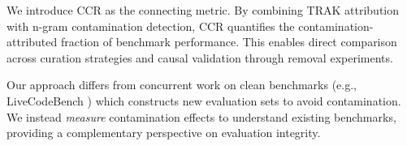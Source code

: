 We introduce CCR as the connecting metric. By combining TRAK attribution with n-gram contamination detection, CCR quantifies the contamination-attributed fraction of benchmark performance. This enables direct comparison across curation strategies and causal validation through removal experiments.

Our approach differs from concurrent work on clean benchmarks (e.g., LiveCodeBench \citep{jain2024livecodebench}) which constructs new evaluation sets to avoid contamination. We instead \textit{measure} contamination effects to understand existing benchmarks, providing a complementary perspective on evaluation integrity.
